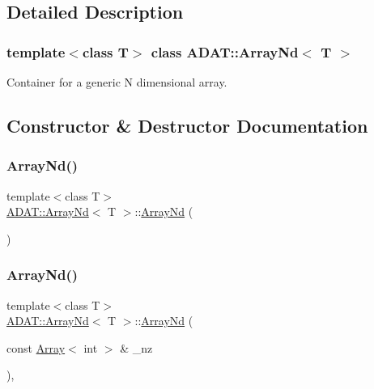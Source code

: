 \subsection{Detailed Description}
\subsubsection*{template$<$class T$>$\newline
class A\+D\+A\+T\+::\+Array\+Nd$<$ T $>$}

Container for a generic N dimensional array. 

\subsection{Constructor \& Destructor Documentation}
\mbox{\label{classADAT_1_1ArrayNd_aafdf6b588aa54b3d59b6952971bcdce4}} 
\subsubsection{\texorpdfstring{ArrayNd()}{ArrayNd()}\hspace{0.1cm}{\footnotesize\ttfamily [1/9]}}
{\footnotesize\ttfamily template$<$class T$>$ \\
\mbox{\hyperlink{classADAT_1_1ArrayNd}{A\+D\+A\+T\+::\+Array\+Nd}}$<$ T $>$\+::\mbox{\hyperlink{classADAT_1_1ArrayNd}{Array\+Nd}} (\begin{DoxyParamCaption}{ }\end{DoxyParamCaption})\hspace{0.3cm}{\ttfamily [inline]}}

\mbox{\label{classADAT_1_1ArrayNd_aea668cd9a67b06d552e4acb9a7dec98c}} 
\subsubsection{\texorpdfstring{ArrayNd()}{ArrayNd()}\hspace{0.1cm}{\footnotesize\ttfamily [2/9]}}
{\footnotesize\ttfamily template$<$class T$>$ \\
\mbox{\hyperlink{classADAT_1_1ArrayNd}{A\+D\+A\+T\+::\+Array\+Nd}}$<$ T $>$\+::\mbox{\hyperlink{classADAT_1_1ArrayNd}{Array\+Nd}} (\begin{DoxyParamCaption}\item[{const \mbox{\hyperlink{classXMLArray_1_1Array}{Array}}$<$ int $>$ \&}]{\+\_\+nz }\end{DoxyParamCaption})\hspace{0.3cm}{\ttfamily [inline]}, {\ttfamily [explicit]}}

